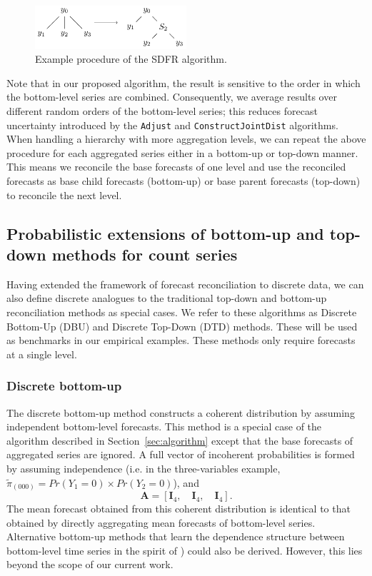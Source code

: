 \documentclass[a4paper,review,11pt,authoryear]{elsarticle}
\let\code=\texttt
\theoremstyle{definition}
\begin{document}
  \begin{figure}
    \centering
    \includegraphics[width=0.5\textwidth]{figures/sdfr.pdf}
    \caption{\label{fig:sdfr}Example procedure of the SDFR algorithm.}
  \end{figure}

  Note that in our proposed algorithm, the result is sensitive to the order in which the bottom-level series are combined. Consequently, we average results over different random orders of the bottom-level series; this reduces forecast uncertainty introduced by the \code{Adjust} and \code{ConstructJointDist} algorithms.
  When handling a hierarchy with more aggregation levels, we can repeat the above procedure for each aggregated series either in a bottom-up or top-down manner. This means we reconcile the base forecasts of one level and use the reconciled forecasts as base child forecasts (bottom-up) or base parent forecasts (top-down) to reconcile the next level.



    \subsection{Probabilistic extensions of bottom-up and top-down methods for count series}

    Having extended the framework of forecast reconciliation to discrete data, we can also define discrete analogues to the traditional top-down and bottom-up reconciliation methods as special cases. We refer to these algorithms as Discrete Bottom-Up (DBU) and Discrete Top-Down (DTD) methods. These will be used as benchmarks in our empirical examples. These methods only require forecasts at a single level.
    
    \subsubsection*{\textbf{Discrete bottom-up}}
    \label{sec:bottomup}

    The discrete bottom-up method constructs a coherent distribution by assuming independent bottom-level forecasts.
    This method is a special case of the algorithm described in Section~\ref{sec:algorithm} except that the base forecasts of aggregated series are ignored. A full vector of incoherent probabilities is formed by assuming independence (i.e. in the three-variables example, $\tilde{\pi}_{(000)} = Pr(Y_1=0)\times Pr(Y_2=0)$), and \[
    \mathbf{A} = [\mathbf{I}_4, \quad \mathbf{I}_4, \quad \mathbf{I}_4 ].
    \]
    The mean forecast obtained from this coherent distribution is identical to that obtained by directly aggregating mean forecasts of bottom-level series. Alternative bottom-up methods that learn the dependence structure between bottom-level time series in the spirit of \citealp{bentaiebHierarchicalProbabilisticForecasting2020}) could also be derived. However, this lies beyond the scope of our current work.
    
\end{document}
